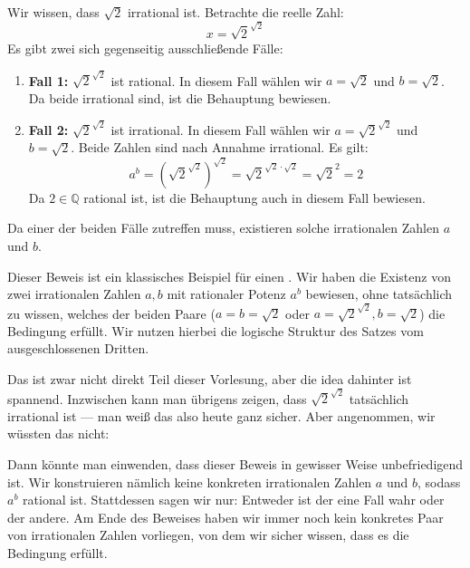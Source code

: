 \begin{math-stroke}

\begin{short-proof}
Wir wissen, dass $\sqrt{2}$ irrational ist. Betrachte die reelle Zahl:
\[ x = \sqrt{2}^{\sqrt{2}} \]
Es gibt zwei sich gegenseitig ausschließende Fälle:
\begin{enumerate}[label=\textbf{\arabic*.}]
    \item \textbf{Fall 1:} $\sqrt{2}^{\sqrt{2}}$ ist rational. In diesem Fall wählen wir $a = \sqrt{2}$ und $b = \sqrt{2}$. Da beide irrational sind, ist die Behauptung bewiesen.
    \item \textbf{Fall 2:} $\sqrt{2}^{\sqrt{2}}$ ist irrational. In diesem Fall wählen wir $a = \sqrt{2}^{\sqrt{2}}$ und $b = \sqrt{2}$. Beide Zahlen sind nach Annahme irrational. Es gilt:
    \[ a^b = \left(\sqrt{2}^{\sqrt{2}}\right)^{\sqrt{2}} = \sqrt{2}^{\sqrt{2} \cdot \sqrt{2}} = \sqrt{2}^2 = 2 \]
    Da $2 \in \mathbb{Q}$ rational ist, ist die Behauptung auch in diesem Fall bewiesen.
\end{enumerate}
Da einer der beiden Fälle zutreffen muss, existieren solche irrationalen Zahlen $a$ und $b$.
\end{short-proof}

\begin{explanation-of-steps}
Dieser Beweis ist ein klassisches Beispiel für einen . Wir haben die Existenz von zwei irrationalen Zahlen $a, b$ mit rationaler Potenz $a^b$ bewiesen, ohne tatsächlich zu wissen, welches der beiden Paare ($a=b=\sqrt{2}$ oder $a=\sqrt{2}^{\sqrt{2}}, b=\sqrt{2}$) die Bedingung erfüllt. Wir nutzen hierbei die logische Struktur des Satzes vom ausgeschlossenen Dritten.
\end{explanation-of-steps}
\end{math-stroke}

\begin{spoken-clean}[00:01:08 - 00:02:25]
Das ist zwar nicht direkt Teil dieser Vorlesung, aber die idea dahinter ist spannend. Inzwischen kann man übrigens zeigen, dass $\sqrt{2}^{\sqrt{2}}$ tatsächlich irrational ist --- man weiß das also heute ganz sicher. Aber angenommen, wir wüssten das nicht:

Dann könnte man einwenden, dass dieser Beweis in gewisser Weise unbefriedigend ist. Wir konstruieren nämlich keine konkreten irrationalen Zahlen $a$ und $b$, sodass $a^b$ rational ist. Stattdessen sagen wir nur: Entweder ist der eine Fall wahr oder der andere. Am Ende des Beweises haben wir immer noch kein konkretes Paar von irrationalen Zahlen vorliegen, von dem wir sicher wissen, dass es die Bedingung erfüllt.
\end{spoken-clean}

